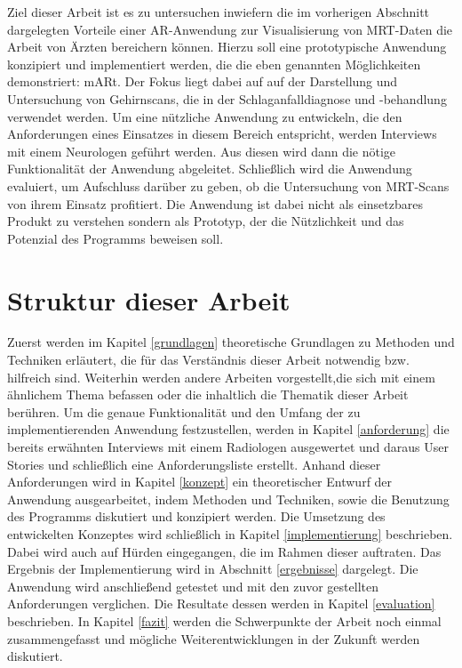 Ziel dieser Arbeit ist es zu untersuchen inwiefern die im vorherigen Abschnitt dargelegten Vorteile einer AR-Anwendung zur Visualisierung von MRT-Daten die Arbeit von Ärzten bereichern können.
Hierzu soll eine prototypische Anwendung konzipiert und implementiert werden, die die eben genannten Möglichkeiten demonstriert: mARt. 
Der Fokus liegt dabei auf auf der Darstellung und Untersuchung von Gehirnscans, die in der Schlaganfalldiagnose und -behandlung verwendet werden.
Um eine nützliche Anwendung zu entwickeln, die den Anforderungen eines Einsatzes in diesem Bereich entspricht, werden Interviews mit einem Neurologen geführt werden. Aus diesen wird dann die nötige Funktionalität der Anwendung abgeleitet. 
Schließlich wird die Anwendung evaluiert, um Aufschluss darüber zu geben, ob die Untersuchung von MRT-Scans von ihrem Einsatz profitiert.
Die Anwendung ist dabei nicht als einsetzbares Produkt zu verstehen sondern als Prototyp, der die Nützlichkeit und das Potenzial des Programms beweisen soll.

\section{Struktur dieser Arbeit}

Zuerst werden im  Kapitel \ref{grundlagen} theoretische Grundlagen zu Methoden und Techniken erläutert, die für das Verständnis dieser Arbeit notwendig bzw. hilfreich sind. Weiterhin werden andere Arbeiten vorgestellt,die sich mit einem ähnlichem Thema befassen oder die inhaltlich die Thematik dieser Arbeit berühren.
Um die genaue Funktionalität und den Umfang der zu implementierenden Anwendung festzustellen, werden in Kapitel \ref{anforderung} die bereits erwähnten Interviews mit einem Radiologen ausgewertet und daraus User Stories und schließlich eine Anforderungsliste erstellt.
Anhand dieser Anforderungen wird in Kapitel \ref{konzept} ein theoretischer Entwurf der Anwendung ausgearbeitet, indem Methoden und Techniken, sowie die Benutzung des Programms diskutiert und konzipiert werden.
Die Umsetzung des entwickelten Konzeptes wird schließlich in Kapitel \ref{implementierung} beschrieben. Dabei wird auch auf Hürden eingegangen, die im Rahmen dieser auftraten.
Das Ergebnis der Implementierung wird in Abschnitt \ref{ergebnisse} dargelegt.
Die Anwendung wird anschließend getestet und mit den zuvor gestellten Anforderungen verglichen. Die Resultate dessen werden in Kapitel \ref{evaluation} beschrieben. 
In Kapitel \ref{fazit} werden die Schwerpunkte der Arbeit noch einmal zusammengefasst und mögliche Weiterentwicklungen in der Zukunft werden diskutiert. 
 
